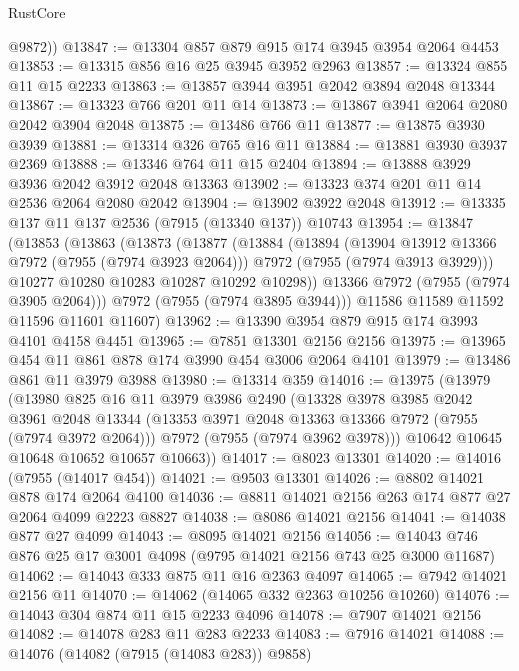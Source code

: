 \begin{lexlean}{RustCore}
\begin{coremodule}
        @9872))
@13847 := @13304 @857 @879 @915 @174 @3945 @3954 @2064 @4453
@13853 := @13315 @856 @16 @25 @3945 @3952 @2963
@13857 := @13324 @855 @11 @15 @2233
@13863 := @13857 @3944 @3951 @2042 @3894 @2048 @13344
@13867 := @13323 @766 @201 @11 @14
@13873 := @13867 @3941 @2064 @2080 @2042 @3904 @2048
@13875 := @13486 @766 @11
@13877 := @13875 @3930 @3939
@13881 := @13314 @326 @765 @16 @11
@13884 := @13881 @3930 @3937 @2369
@13888 := @13346 @764 @11 @15 @2404
@13894 := @13888 @3929 @3936 @2042 @3912 @2048 @13363
@13902 := @13323 @374 @201 @11 @14 @2536 @2064 @2080 @2042
@13904 := @13902 @3922 @2048
@13912 := @13335 @137 @11 @137 @2536 (@7915 (@13340 @137)) @10743
@13954 := @13847
    (@13853
      (@13863
        (@13873
          (@13877
            (@13884
              (@13894
                (@13904 @13912 @13366 @7972 (@7955 (@7974 @3923 @2064)))
                @7972
                (@7955 (@7974 @3913 @3929)))
              @10277
              @10280
              @10283
              @10287
              @10292
              @10298))
          @13366
          @7972
          (@7955 (@7974 @3905 @2064)))
        @7972
        (@7955 (@7974 @3895 @3944)))
      @11586
      @11589
      @11592
      @11596
      @11601
      @11607)
@13962 := @13390 @3954 @879 @915 @174 @3993 @4101 @4158 @4451
@13965 := @7851 @13301 @2156 @2156
@13975 := @13965 @454 @11 @861 @878 @174 @3990 @454 @3006 @2064 @4101
@13979 := @13486 @861 @11 @3979 @3988
@13980 := @13314 @359
@14016 := @13975
    (@13979
      (@13980
        @825
        @16
        @11
        @3979
        @3986
        @2490
        (@13328
          @3978
          @3985
          @2042
          @3961
          @2048
          @13344
          (@13353 @3971 @2048 @13363 @13366 @7972 (@7955 (@7974 @3972 @2064)))
          @7972
          (@7955 (@7974 @3962 @3978)))
        @10642
        @10645
        @10648
        @10652
        @10657
        @10663))
@14017 := @8023 @13301
@14020 := @14016 (@7955 (@14017 @454))
@14021 := @9503 @13301
@14026 := @8802 @14021 @878 @174 @2064 @4100
@14036 := @8811 @14021 @2156 @263 @174 @877 @27 @2064 @4099 @2223 @8827
@14038 := @8086 @14021 @2156
@14041 := @14038 @877 @27 @4099
@14043 := @8095 @14021 @2156
@14056 := @14043 @746 @876 @25 @17 @3001 @4098 (@9795 @14021 @2156 @743 @25 @3000 @11687)
@14062 := @14043 @333 @875 @11 @16 @2363 @4097
@14065 := @7942 @14021 @2156 @11
@14070 := @14062 (@14065 @332 @2363 @10256 @10260)
@14076 := @14043 @304 @874 @11 @15 @2233 @4096
@14078 := @7907 @14021 @2156
@14082 := @14078 @283 @11 @283 @2233
@14083 := @7916 @14021
@14088 := @14076 (@14082 (@7915 (@14083 @283)) @9858)

\end{coremodule}
\end{lexlean}
